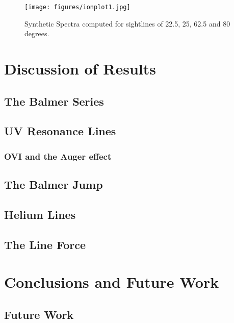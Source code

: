 \documentclass[useAMS,usenatbib, onecolumn]{mn2ejm}
\begin{document}
\begin{figure}
\texttt{[image: figures/ionplot1.jpg]}
\caption{Synthetic Spectra computed for sightlines of 22.5, 25, 62.5 and 80 degrees.}
\end{figure}


%
%

\section{Discussion of Results}

\subsection{The Balmer Series}

\subsection{UV Resonance Lines}
\subsubsection{OVI and the Auger effect}

\subsection{The Balmer Jump}
\label{balmerjump}

\subsection{Helium Lines}

\subsection{The Line Force}




%
%


\section{Conclusions and Future Work}



\subsection{Future Work}
\end{document}
